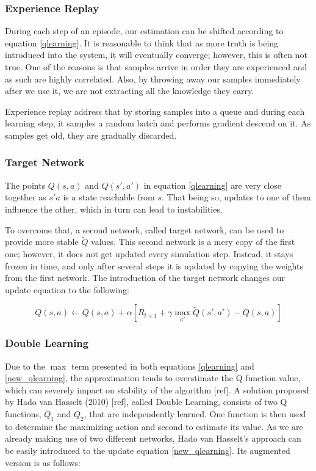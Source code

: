 \documentclass[11pt,twoside]{article}
\begin{document}
\subsubsection{Experience Replay}

During each step of an episode, our estimation can be shifted according to equation \ref{qlearning}. It is reasonable to think that as more truth is being introduced into the system, it will eventually converge; however, this is often not true. One of the reasons is that samples arrive in order they are experienced and as such are highly correlated. Also, by throwing away our samples immediately after we use it, we are not extracting all the knowledge they carry.

Experience replay address that by storing samples into a queue and during each learning step, it samples a random batch and performs gradient descend on it. As samples get old, they are gradually discarded.

\subsubsection{Target Network}

The points $Q(s, a)$ and $Q(s', a')$ in equation \ref{qlearning} are very close together as $s'a$ is a state reachable from $s$. That being so, updates to one of them influence the other, which in turn can lead to instabilities.

To overcome that, a second network, called target network, can be used to provide more stable $\widetilde{Q}$ values. This second network is a mery copy of the first one; however, it does not get updated every simulation step. Instead, it stays frozen in time, and only after several steps it is updated by copying the weights from the first network. The introduction of the target network changes our update equation to the following:

\begin{equation} \label{new_qlearning}
	Q(s, a) \leftarrow Q(s, a) + \alpha [R_{t+1} + \gamma \max_{a'}\widetilde{Q}(s', a') - Q(s,a)]
\end{equation}


\subsubsection{Double Learning}

Due to the $\max$ term presented in both equations \ref{qlearning} and \ref{new_qlearning}, the approximation tends to overstimate the Q function value, which can severely impact on stability of the algorithm [ref]. A solution proposed by Hado van Hasselt (2010) [ref], called Double Learning, consists of two Q functions, $Q_1$ and $Q_2$, that are independently learned. One function is then used to determine the maximizing action and second to estimate its value. As we are already making use of two different networks, Hado van Hasselt's approach can be easily introduced to the update equation \ref{new_qlearning}. Its augmented version is as follows:
\end{document}
